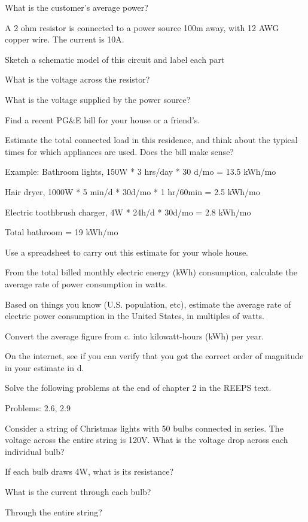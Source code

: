 \documentclass{article}
\begin{document}
\subproblem
What is the customer's average power?



A 2 ohm resistor is connected to a power source 100m away, with 12 AWG copper
wire. The current is 10A.

\subproblem
Sketch a schematic model of this circuit and label each part

\subproblem
What is the voltage across the resistor?

\subproblem
What is the voltage supplied by the power source?


Find a recent PG\&E bill for your house or a friend's.

\subproblem
Estimate the total connected load in this residence, and think
about the typical times for which appliances are used.  Does the
bill make sense?

Example: Bathroom lights, 150W * 3 hrs/day * 30 d/mo = 13.5 kWh/mo

Hair dryer, 1000W * 5 min/d * 30d/mo * 1 hr/60min = 2.5 kWh/mo

Electric toothbrush charger, 4W * 24h/d * 30d/mo = 2.8 kWh/mo

Total bathroom = 19 kWh/mo

Use a spreadsheet to carry out this estimate for your whole house.

\subproblem
From the total billed monthly electric energy (kWh) consumption,
calculate the average rate of power consumption in watts.

\subproblem
Based on things you know (U.S. population, etc), estimate the
average rate of electric power consumption in the United States, in
multiples of watts.

\subproblem
Convert the average figure from c. into kilowatt-hours (kWh) per year.

\subproblem
On the internet, see if you can verify that you got the correct
order of magnitude in your estimate in d.



Solve the following problems at the end of chapter 2 in the REEPS text.

Problems:  2.6, 2.9


\subproblem
Consider a string of Christmas lights with 50 bulbs connected in series.
The voltage across the entire string is 120V.  What is the voltage drop across
each individual bulb?

\subproblem
If each bulb draws 4W, what is its resistance?

\subproblem
What is the current through each bulb?

\subproblem
Through the entire string?
\end{document}
